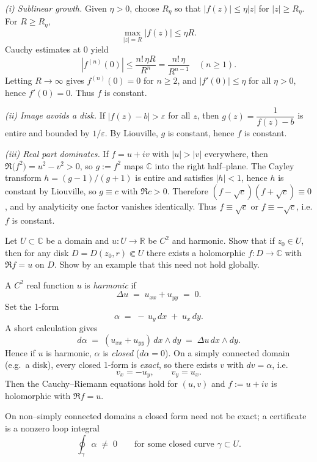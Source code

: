 \begin{solution}
\emph{(i) Sublinear growth.}
Given $\eta>0$, choose $R_\eta$ so that $|f(z)|\le \eta|z|$ for $|z|\ge R_\eta$.
For $R\ge R_\eta$,
\[
\max_{|z|=R}|f(z)|\le \eta R.
\]
Cauchy estimates at $0$ yield
\[
|f^{(n)}(0)|\le \frac{n!\,\eta R}{R^n}=\frac{n!\,\eta}{R^{n-1}}\quad(n\ge 1).
\]
Letting $R\to\infty$ gives $f^{(n)}(0)=0$ for $n\ge 2$, and $|f'(0)|\le \eta$ for all $\eta>0$, hence $f'(0)=0$.
Thus $f$ is constant.

\medskip
\emph{(ii) Image avoids a disk.}
If $|f(z)-b|>\varepsilon$ for all $z$, then $g(z)=\dfrac{1}{f(z)-b}$ is entire and bounded by $1/\varepsilon$.
By Liouville, $g$ is constant, hence $f$ is constant.

\medskip
\emph{(iii) Real part dominates.}
If $f=u+iv$ with $|u|>|v|$ everywhere, then $\Re\big(f^2\big)=u^2-v^2>0$, so $g:=f^2$ maps $\mathbb C$ into the right half–plane.
The Cayley transform $h=(g-1)/(g+1)$ is entire and satisfies $|h|<1$, hence $h$ is constant by Liouville, so $g\equiv c$ with $\Re c>0$.
Therefore $(f-\sqrt c)(f+\sqrt c)\equiv 0$, and by analyticity one factor vanishes identically.
Thus $f\equiv \sqrt c$ or $f\equiv -\sqrt c$, i.e. $f$ is constant.
\end{solution}

\begin{problem}[CP-IV-0126]
\label{prob:cp-iv-0126}
Let $U\subset\mathbb C$ be a domain and $u:U\to\mathbb R$ be $C^2$ and harmonic.
Show that if $z_0\in U$, then for any disk $D=D(z_0,r)\Subset U$ there exists a holomorphic
$f:D\to\mathbb C$ with $\Re f=u$ on $D$.
Show by an example that this need not hold globally.

\medskip

A $C^2$ real function $u$ is \emph{harmonic} if
\[
\Delta u \;=\; u_{xx}+u_{yy} \;=\; 0.
\]
Set the 1-form
\[
\alpha \;=\; -\,u_y\,dx \;+\; u_x\,dy.
\]
A short calculation gives
\[
d\alpha \;=\; (u_{xx}+u_{yy})\,dx\wedge dy \;=\; \Delta u\,dx\wedge dy.
\]
Hence if $u$ is harmonic, $\alpha$ is \emph{closed} ($d\alpha=0$).
On a simply connected domain (e.g.\ a disk), every closed 1-form is \emph{exact}, so there exists
$v$ with $dv=\alpha$, i.e.
\[
v_x=-u_y, \qquad v_y=u_x.
\]
Then the Cauchy–Riemann equations hold for $(u,v)$ and $f:=u+iv$ is holomorphic with $\Re f=u$.

\smallskip
On non–simply connected domains a closed form need not be exact; a certificate is a nonzero loop integral
\[
\oint_\gamma \alpha \;\neq\; 0
\qquad\text{for some closed curve }\gamma\subset U.
\]

\medskip
\end{problem}


